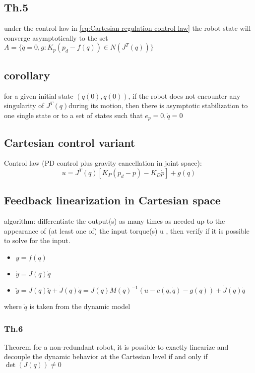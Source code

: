 \documentclass[a4paper,12pt]{article}
\begin{document}
\subsection{Th.5}
under the control law in \ref{eq:Cartesian regulation control law} the 
robot state will converge asymptotically to the set 
$A = \{\dot{q}=0,g:K_p(p_d-f(q)) \in N(J^T(q))\}$
\subsection{corollary}
for a given initial state $(q(0),\dot{q}(0))$, if the robot does not
encounter any singularity of $J^T(q)$during its motion, then there 
is asymptotic
stabilization to one single state or to a set of
states such that $e_p=0, \dot{q}=0$
\subsection{Cartesian control variant}
Control law (PD control plus gravity cancellation in joint space):
\begin{equation}
    u = J^T(q)[K_P(p_d-p) - K_D\dot{p}] + g(q)
\end{equation}
\subsection{Feedback linearization in Cartesian space}
algorithm: differentiate the output(s) as many times as needed
up to the appearance of (at least one of) the input torque(s) u ,
then verify if it is possible to solve for the input.
\begin{itemize}
\item $y=f(q)$
\item $\dot{y}=J(q)\dot{q}$
\item $\ddot{y}=J(q)\ddot{q}+ \dot{J}(q)\dot{q}= J(q)M(q)^{-1}(u-c(q,\dot{q})-g(q))+\dot{J}(q)\dot{q}$
\end{itemize}
where $\ddot{q}$ is taken from the dynamic model
\subsubsection{Th.6}
Theorem
for a non-redundant robot, it is possible to exactly linearize and
decouple the dynamic behavior at the Cartesian level if and only if
$\det(J(q)) \neq 0$ 
\end{document}
